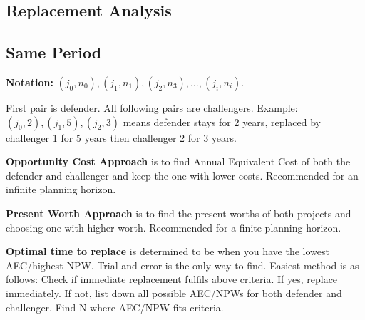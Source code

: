 \documentclass[landscape, letterpaper, 10pt]{article}
\begin{document}
\begin{multicols}{3}
    \section*{Replacement Analysis}
    \subsection*{Same Period}
    \textbf{Notation:} $(j_0, n_0), (j_1, n_1), (j_2, n_3), \ldots, (j_i, n_i)$.

    First pair is defender. All following pairs are challengers. Example: $(j_0, 2), (j_1, 5), (j_2, 3)$ means defender stays for 2 years, replaced by challenger 1 for 5 years then challenger 2 for 3 years.

    \textbf{Opportunity Cost Approach} is to find Annual Equivalent Cost of both the defender and challenger and keep the one with lower costs. Recommended for an infinite planning horizon.

    \textbf{Present Worth Approach} is to find the present worths of both projects and choosing one with higher worth. Recommended for a finite planning horizon.

    \textbf{Optimal time to replace} is determined to be when you have the lowest AEC/highest NPW. Trial and error is the only way to find. Easiest method is as follows: Check if immediate replacement fulfils above criteria. If yes, replace immediately. If not, list down all possible AEC/NPWs for both defender and challenger. Find N where AEC/NPW fits criteria.

\end{multicols}
\end{document}
